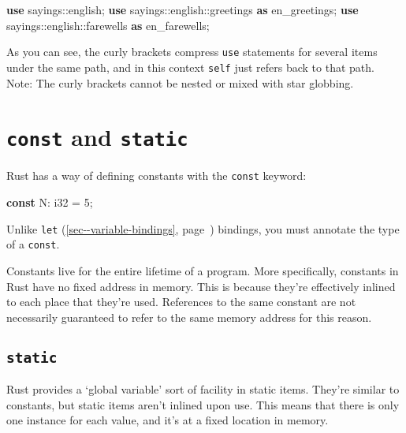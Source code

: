 \documentclass[a4paper,]{book}
\renewcommand*{\hyperref}[2][\ar]{%
  \def\ar{#2}%
  #2 (\autoref{#1}, page~\pageref{#1})}
\newenvironment{Shaded}{\begin{snugshade}}{\end{snugshade}}
\newcommand{\KeywordTok}[1]{\textcolor[rgb]{0.13,0.29,0.53}{\textbf{{#1}}}}
\newcommand{\DataTypeTok}[1]{\textcolor[rgb]{0.13,0.29,0.53}{{#1}}}
\newcommand{\DecValTok}[1]{\textcolor[rgb]{0.00,0.00,0.81}{{#1}}}
\newcommand{\NormalTok}[1]{{#1}}
\begin{document}
\begin{Shaded}
\begin{Highlighting}[]
\KeywordTok{use} \NormalTok{sayings::english;}
\KeywordTok{use} \NormalTok{sayings::english::greetings }\KeywordTok{as} \NormalTok{en_greetings;}
\KeywordTok{use} \NormalTok{sayings::english::farewells }\KeywordTok{as} \NormalTok{en_farewells;}
\end{Highlighting}
\end{Shaded}

As you can see, the curly brackets compress \texttt{use} statements for
several items under the same path, and in this context \texttt{self}
just refers back to that path. Note: The curly brackets cannot be nested
or mixed with star globbing.

\section{\texorpdfstring{\texttt{const} and
\texttt{static}}{const and static}}\label{sec--const-and-static}

Rust has a way of defining constants with the \texttt{const} keyword:

\begin{Shaded}
\begin{Highlighting}[]
\KeywordTok{const} \NormalTok{N: }\DataTypeTok{i32} \NormalTok{= }\DecValTok{5}\NormalTok{;}
\end{Highlighting}
\end{Shaded}

Unlike \hyperref[sec--variable-bindings]{\texttt{let}} bindings, you
must annotate the type of a \texttt{const}.

Constants live for the entire lifetime of a program. More specifically,
constants in Rust have no fixed address in memory. This is because
they're effectively inlined to each place that they're used. References
to the same constant are not necessarily guaranteed to refer to the same
memory address for this reason.

\subsection{\texorpdfstring{\texttt{static}}{static}}\label{static-1}

Rust provides a `global variable' sort of facility in static items.
They're similar to constants, but static items aren't inlined upon use.
This means that there is only one instance for each value, and it's at a
fixed location in memory.
\end{document}
